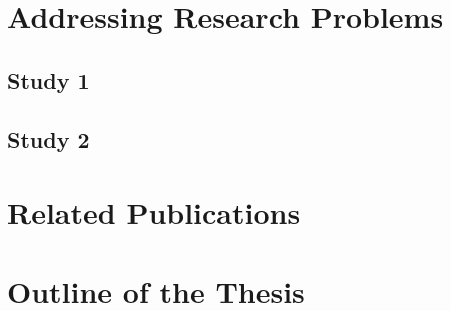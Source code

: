 \section{Addressing Research Problems}
\subsection{Study 1}

\subsection{Study 2}

\section{Related Publications}

\section{Outline of the Thesis}
